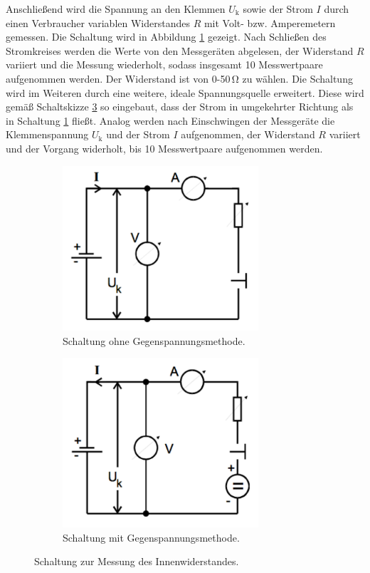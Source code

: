 Anschließend wird die Spannung an den Klemmen $U_\text{k}$ sowie der Strom $I$ durch einen Verbraucher variablen Widerstandes $R$ mit Volt- bzw. Amperemetern gemessen.
Die Schaltung wird in Abbildung \ref{fig:ri} gezeigt.
Nach Schließen des Stromkreises werden die Werte von den Messgeräten abgelesen, der Widerstand $R$ variiert und die Messung wiederholt, sodass insgesamt 10 Messwertpaare aufgenommen werden.
Der Widerstand ist von 0-50\,\si{\ohm} zu wählen.
Die Schaltung wird im Weiteren durch eine weitere, ideale Spannungsquelle erweitert.
Diese wird gemäß Schaltskizze \ref{fig:rimgu} so eingebaut, dass der Strom in umgekehrter Richtung als in Schaltung \ref{fig:ri} fließt.
Analog werden nach Einschwingen der Messgeräte die Klemmenspannung $U_\text{k}$ und der Strom $I$ aufgenommen, der Widerstand $R$ variiert und der Vorgang widerholt, bis 10 Messwertpaare aufgenommen werden.
\begin{figure}
	\begin{subfigure}{0.5\textwidth}
	\centering
	\includegraphics[width=0.8\textwidth]{Bilder/Messung1.pdf}
	\caption{Schaltung ohne Gegenspannungsmethode.}
	\label{fig:ri}
	\end{subfigure}
	\begin{subfigure}{0.5\textwidth}
	\centering
	\includegraphics[width=0.8\textwidth]{Bilder/Messung2.pdf}
	\caption{Schaltung mit Gegenspannungsmethode.}
	\label{fig:rimgu}
	\end{subfigure}
	\caption{Schaltung zur Messung des Innenwiderstandes.\cite{V301}}
\end{figure}


